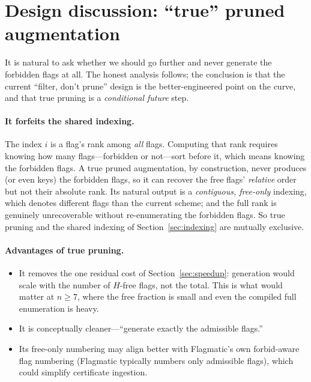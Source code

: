 \documentclass[11pt]{article}
\theoremstyle{definition}
\begin{document}
\section{Design discussion: ``true'' pruned augmentation}\label{sec:truepruning}

It is natural to ask whether we should go further and never generate the
forbidden flags at all. The honest analysis follows; the conclusion is that the
current ``filter, don't prune'' design is the better-engineered point on the
curve, and that true pruning is a \emph{conditional future} step.

\paragraph{It forfeits the shared indexing.}
The index $i$ is a flag's rank among \emph{all} flags. Computing that rank
requires knowing how many flags---forbidden or not---sort before it, which means
knowing the forbidden flags. A true pruned augmentation, by construction, never
produces (or even keys) the forbidden flags, so it can recover the free flags'
\emph{relative} order but not their absolute rank. Its natural output is a
\emph{contiguous, free-only} indexing, which denotes different flags than the
current scheme; and the full rank is genuinely unrecoverable without
re-enumerating the forbidden flags. So true pruning and the shared indexing of
Section~\ref{sec:indexing} are mutually exclusive.

\paragraph{Advantages of true pruning.}
\begin{itemize}
  \item It removes the one residual cost of Section~\ref{sec:speedup}: generation
        would scale with the number of $H$-free flags, not the total. This is what
        would matter at $n \ge 7$, where the free fraction is small and even the
        compiled full enumeration is heavy.
  \item It is conceptually cleaner---``generate exactly the admissible flags.''
  \item Its free-only numbering may align better with Flagmatic's own
        forbid-aware flag numbering (Flagmatic typically numbers only admissible
        flags), which could simplify certificate ingestion.
\end{itemize}
\end{document}
